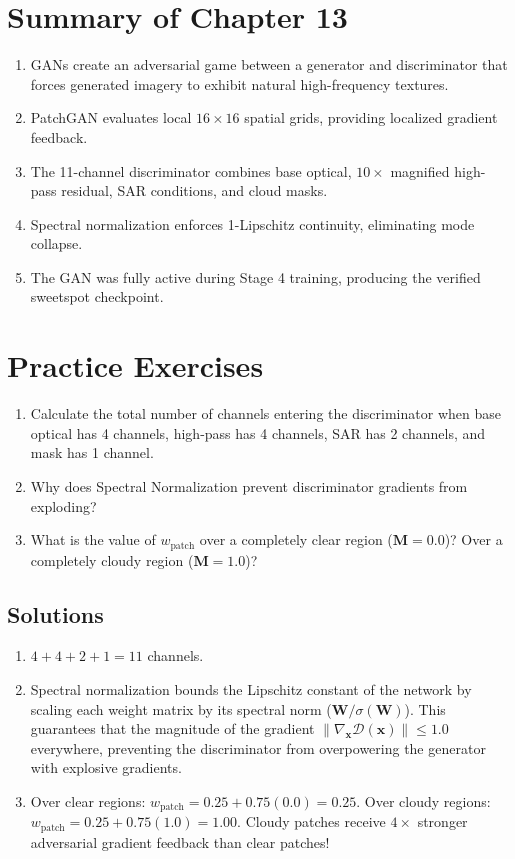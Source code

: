 \section{Summary of Chapter 13}
\begin{enumerate}
    \item GANs create an adversarial game between a generator and discriminator that forces generated imagery to exhibit natural high-frequency textures.
    \item PatchGAN evaluates local $16 \times 16$ spatial grids, providing localized gradient feedback.
    \item The 11-channel discriminator combines base optical, $10\times$ magnified high-pass residual, SAR conditions, and cloud masks.
    \item Spectral normalization enforces 1-Lipschitz continuity, eliminating mode collapse.
    \item The GAN was fully active during Stage 4 training, producing the verified sweetspot checkpoint.
\end{enumerate}

\section{Practice Exercises}
\begin{enumerate}
    \item Calculate the total number of channels entering the discriminator when base optical has 4 channels, high-pass has 4 channels, SAR has 2 channels, and mask has 1 channel.
    \item Why does Spectral Normalization prevent discriminator gradients from exploding?
    \item What is the value of $w_{\text{patch}}$ over a completely clear region ($\mathbf{M} = 0.0$)? Over a completely cloudy region ($\mathbf{M} = 1.0$)?
\end{enumerate}

\subsection*{Solutions}
\begin{enumerate}
    \item $4 + 4 + 2 + 1 = 11$ channels.
    \item Spectral normalization bounds the Lipschitz constant of the network by scaling each weight matrix by its spectral norm ($\mathbf{W} / \sigma(\mathbf{W})$). This guarantees that the magnitude of the gradient $\|\nabla_{\mathbf{x}} \mathcal{D}(\mathbf{x})\| \le 1.0$ everywhere, preventing the discriminator from overpowering the generator with explosive gradients.
    \item Over clear regions: $w_{\text{patch}} = 0.25 + 0.75(0.0) = 0.25$. Over cloudy regions: $w_{\text{patch}} = 0.25 + 0.75(1.0) = 1.00$. Cloudy patches receive $4\times$ stronger adversarial gradient feedback than clear patches!
\end{enumerate}
